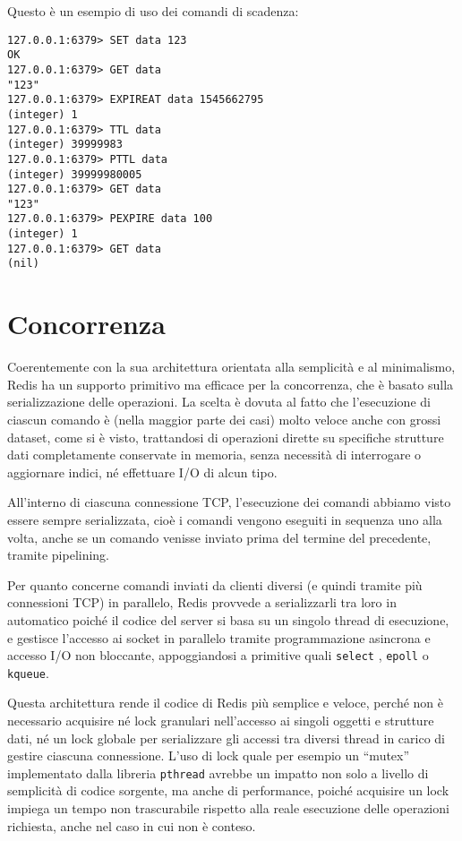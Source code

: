 Questo è un esempio di uso dei comandi di scadenza:

\medskip
\begin{lstlisting}
127.0.0.1:6379> SET data 123
OK
127.0.0.1:6379> GET data
"123"
127.0.0.1:6379> EXPIREAT data 1545662795
(integer) 1
127.0.0.1:6379> TTL data
(integer) 39999983
127.0.0.1:6379> PTTL data
(integer) 39999980005
127.0.0.1:6379> GET data
"123"
127.0.0.1:6379> PEXPIRE data 100
(integer) 1
127.0.0.1:6379> GET data
(nil)
\end{lstlisting}

\section{Concorrenza}
\label{sec:concurrency}

Coerentemente con la sua architettura orientata alla semplicità e al minimalismo, Redis ha un
supporto primitivo ma efficace per la concorrenza, che è basato sulla serializzazione delle
operazioni. La scelta è dovuta al fatto che l'esecuzione di ciascun comando è (nella maggior parte
dei casi) molto veloce anche con grossi dataset, come si è visto, trattandosi di operazioni dirette
su specifiche strutture dati completamente conservate in memoria, senza necessità di interrogare o
aggiornare indici, né effettuare I/O di alcun tipo.

All'interno di ciascuna connessione TCP, l'esecuzione dei comandi abbiamo visto essere sempre
serializzata, cioè i comandi vengono eseguiti in sequenza uno alla volta, anche se un comando
venisse inviato prima del termine del precedente, tramite pipelining.

Per quanto concerne comandi inviati da clienti diversi (e quindi tramite più connessioni TCP) in
parallelo, Redis provvede a serializzarli tra loro in automatico poiché il codice del server si
basa su un singolo thread di esecuzione, e gestisce l'accesso ai socket in parallelo tramite
programmazione asincrona e accesso I/O non bloccante, appoggiandosi a primitive quali \verb|select| 
\cite{select}, \verb|epoll| \cite{epoll} o \verb|kqueue|.

Questa architettura rende il codice di Redis più semplice e veloce, perché non è necessario
acquisire né lock granulari nell'accesso ai singoli oggetti e strutture dati, né un lock globale per
serializzare gli accessi tra diversi thread in carico di gestire ciascuna connessione. L'uso di lock
quale per esempio un ``mutex'' implementato dalla libreria \verb|pthread| avrebbe un impatto non
solo a livello di semplicità di codice sorgente, ma anche di performance, poiché acquisire un lock
impiega un tempo non trascurabile rispetto alla reale esecuzione delle operazioni richiesta, anche
nel caso in cui non è conteso.

